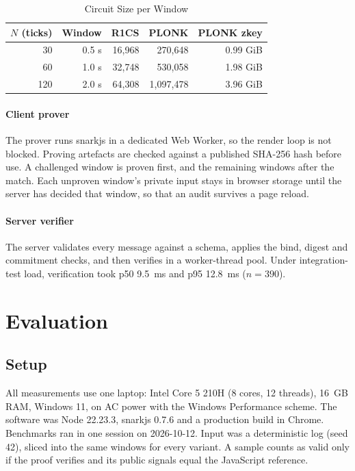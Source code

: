 \documentclass[conference]{IEEEtran}
\begin{document}
\begin{table}[t]
\centering
\caption{Circuit Size per Window}
\label{tab:circuit}
\begin{tabular}{@{}rrrrr@{}}
\toprule
$N$ (ticks) & Window & R1CS & PLONK & PLONK zkey \\
\midrule
30 & 0.5 s & 16,968 & 270,648 & 0.99 GiB \\ %
60 & 1.0 s & 32,748 & 530,058 & 1.98 GiB \\ %
120 & 2.0 s & 64,308 & 1,097,478 & 3.96 GiB \\ %
\bottomrule
\end{tabular}
\end{table}

\paragraph*{Client prover}
The prover runs snarkjs in a dedicated Web Worker, so the render loop is not blocked. %
Proving artefacts are checked against a published SHA-256 hash before use. %
A challenged window is proven first, and the remaining windows after the match.
Each unproven window's private input stays in browser storage until the server has decided that window, so that an audit survives a page reload.

\paragraph*{Server verifier}
The server validates every message against a schema, applies the bind, digest and commitment checks, and then verifies in a worker-thread pool.
Under integration-test load, verification took p50 9.5~ms and p95 12.8~ms ($n=390$). %

\section{Evaluation}

\subsection{Setup}
All measurements use one laptop: Intel Core 5 210H (8 cores, 12 threads), 16~GB RAM, Windows 11, on AC power with the Windows Performance scheme. %
The software was Node 22.23.3, snarkjs 0.7.6 and a production build in Chrome. %
Benchmarks ran in one session on 2026-10-12. %
Input was a deterministic log (seed 42), sliced into the same windows for every variant. %
A sample counts as valid only if the proof verifies and its public signals equal the JavaScript reference. %
\end{document}
